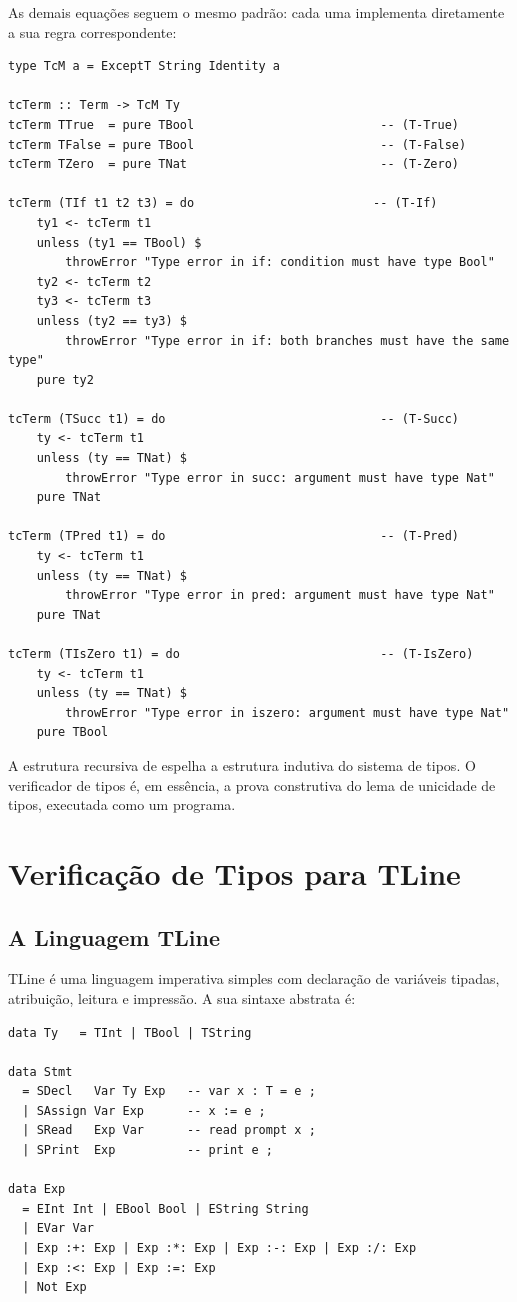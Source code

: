 As demais equações seguem o mesmo padrão: cada uma implementa
diretamente a sua regra correspondente:

\begin{verbatim}
type TcM a = ExceptT String Identity a

tcTerm :: Term -> TcM Ty
tcTerm TTrue  = pure TBool                          -- (T-True)
tcTerm TFalse = pure TBool                          -- (T-False)
tcTerm TZero  = pure TNat                           -- (T-Zero)

tcTerm (TIf t1 t2 t3) = do                         -- (T-If)
    ty1 <- tcTerm t1
    unless (ty1 == TBool) $
        throwError "Type error in if: condition must have type Bool"
    ty2 <- tcTerm t2
    ty3 <- tcTerm t3
    unless (ty2 == ty3) $
        throwError "Type error in if: both branches must have the same type"
    pure ty2

tcTerm (TSucc t1) = do                              -- (T-Succ)
    ty <- tcTerm t1
    unless (ty == TNat) $
        throwError "Type error in succ: argument must have type Nat"
    pure TNat

tcTerm (TPred t1) = do                              -- (T-Pred)
    ty <- tcTerm t1
    unless (ty == TNat) $
        throwError "Type error in pred: argument must have type Nat"
    pure TNat

tcTerm (TIsZero t1) = do                            -- (T-IsZero)
    ty <- tcTerm t1
    unless (ty == TNat) $
        throwError "Type error in iszero: argument must have type Nat"
    pure TBool
\end{verbatim}

A estrutura recursiva de  espelha a
estrutura indutiva do sistema de tipos. O verificador de tipos é, em
essência, a prova construtiva do lema de unicidade de tipos,
executada como um programa.

\section{Verificação de Tipos para TLine}

\subsection{A Linguagem TLine}

TLine é uma linguagem imperativa simples com declaração de variáveis
tipadas, atribuição, leitura e impressão. A sua sintaxe abstrata é:

\begin{verbatim}
data Ty   = TInt | TBool | TString

data Stmt
  = SDecl   Var Ty Exp   -- var x : T = e ;
  | SAssign Var Exp      -- x := e ;
  | SRead   Exp Var      -- read prompt x ;
  | SPrint  Exp          -- print e ;

data Exp
  = EInt Int | EBool Bool | EString String
  | EVar Var
  | Exp :+: Exp | Exp :*: Exp | Exp :-: Exp | Exp :/: Exp
  | Exp :<: Exp | Exp :=: Exp
  | Not Exp
\end{verbatim}

